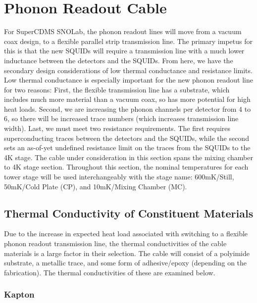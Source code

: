 \documentclass{report}
\begin{document}
\section{Phonon Readout Cable}

For SuperCDMS SNOLab, the phonon readout lines will move from a vacuum coax design, to a flexible parallel strip transmission line. The primary impetus for this is that the new SQUIDs will require a transmission line with a much lower inductance between the detectors and the SQUIDs. From here, we have the secondary design considerations of low thermal conductance and resistance limits. Low thermal conductance is especially important for the new phonon readout line for two reasons: First, the flexible transmission line has a substrate, which includes much more material than a vacuum coax, so has more potential for high heat loads. Second, we are increasing the phonon channels per detector from 4 to 6, so there will be increased trace numbers (which increases transmission line width). Last, we must meet two resistance requirements. The first requires superconducting traces between the detectors and the SQUIDs, while the second sets an as-of-yet undefined resistance limit on the traces from the SQUIDs to the 4K stage. The cable under consideration in this section spans the mixing chamber to 4K stage section. Throughout this section, the nominal temperatures for each tower stage will be used interchangeably with the stage name: 600mK/Still, 50mK/Cold Plate (CP), and 10mK/Mixing Chamber (MC).

\subsection{Thermal Conductivity of Constituent Materials}

Due to the increase in expected heat load associated with switching to a flexible phonon readout transmission line, the thermal conductivities of the cable materials is a large factor in their selection. The cable will consist of a polyimide substrate, a metallic trace, and some form of adhesive/epoxy (depending on the fabrication). The thermal conductivities of these are examined below.

\subsubsection{Kapton}
\end{document}
